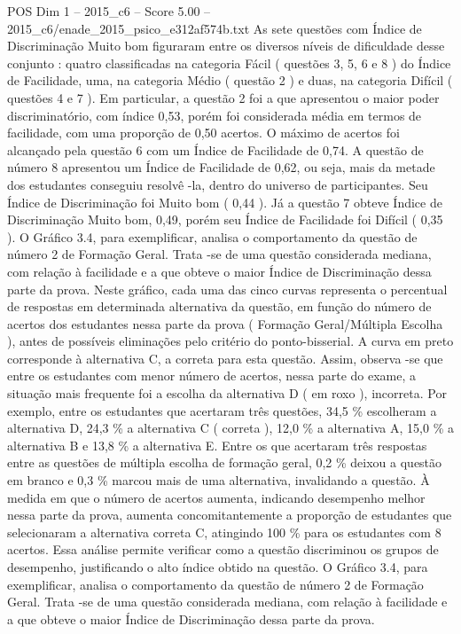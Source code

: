 \begin{textsample}{POS Dim 1 – 2015\_c6 – Score 5.00 – 2015\_c6/enade\_2015\_psico\_e312af574b.txt}
As sete questões com Índice de Discriminação Muito bom figuraram entre os diversos níveis de dificuldade desse conjunto : quatro classificadas na categoria Fácil ( questões 3, 5, 6 e 8 ) do Índice de Facilidade, uma, na categoria Médio ( questão 2 ) e duas, na categoria Difícil ( questões 4 e 7 ).
Em particular, a questão 2 foi a que apresentou o maior poder discriminatório, com índice 0,53, porém foi considerada média em termos de facilidade, com uma proporção de 0,50 acertos.
O máximo de acertos foi alcançado pela questão 6 com um Índice de Facilidade de 0,74.
A questão de número 8 apresentou um Índice de Facilidade de 0,62, ou seja, mais da metade dos estudantes conseguiu resolvê -la, dentro do universo de participantes.
Seu Índice de Discriminação foi Muito bom ( 0,44 ).
Já a questão 7 obteve Índice de Discriminação Muito bom, 0,49, porém seu Índice de Facilidade foi Difícil ( 0,35 ).
O Gráfico 3.4, para exemplificar, analisa o comportamento da questão de número 2 de Formação Geral.
Trata -se de uma questão considerada mediana, com relação à facilidade e a que obteve o maior Índice de Discriminação dessa parte da prova.
Neste gráfico, cada uma das cinco curvas representa o percentual de respostas em determinada alternativa da questão, em função do número de acertos dos estudantes nessa parte da prova ( Formação Geral/Múltipla Escolha ), antes de possíveis eliminações pelo critério do ponto-bisserial.
A curva em preto corresponde à alternativa C, a correta para esta questão.
Assim, observa -se que entre os estudantes com menor número de acertos, nessa parte do exame, a situação mais frequente foi a escolha da alternativa D ( em roxo ), incorreta.
Por exemplo, entre os estudantes que acertaram três questões, 34,5 \% escolheram a alternativa D, 24,3 \% a alternativa C ( correta ), 12,0 \% a alternativa A, 15,0 \% a alternativa B e 13,8 \% a alternativa E.
Entre os que acertaram três respostas entre as questões de múltipla escolha de formação geral, 0,2 \% deixou a questão em branco e 0,3 \% marcou mais de uma alternativa, invalidando a questão.
À medida em que o número de acertos aumenta, indicando desempenho melhor nessa parte da prova, aumenta concomitantemente a proporção de estudantes que selecionaram a alternativa correta C, atingindo 100 \% para os estudantes com 8 acertos.
Essa análise permite verificar como a questão discriminou os grupos de desempenho, justificando o alto índice obtido na questão.
O Gráfico 3.4, para exemplificar, analisa o comportamento da questão de número 2 de Formação Geral.
Trata -se de uma questão considerada mediana, com relação à facilidade e a que obteve o maior Índice de Discriminação dessa parte da prova.

\end{textsample}

